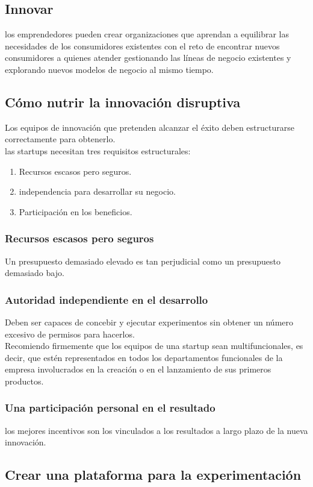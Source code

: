 \documentclass[10pt]{article}
\begin{document}
\begin{multicols}{2}
\section*{Innovar}
los emprendedores
{\color{blue}pueden crear organizaciones que aprendan a equilibrar las necesidades de los consumidores
 existentes con el reto de encontrar nuevos consumidores a quienes atender gestionando las líneas de negocio existentes y explorando nuevos modelos de negocio al mismo tiempo.}\\
\subsection*{Cómo nutrir la innovación disruptiva}
Los equipos de innovación que pretenden alcanzar el éxito deben estructurarse correctamente para obtenerlo. \\
las startups necesitan tres requisitos estructurales:
\begin{enumerate}[\bfseries 1.]
\item Recursos escasos pero seguros.
\item independencia para desarrollar su negocio.
\item Participación en los beneficios.
\end{enumerate}
\subsubsection*{Recursos escasos pero seguros}
Un presupuesto demasiado elevado es tan perjudicial como un presupuesto demasiado bajo.
\subsubsection*{Autoridad independiente en el desarrollo}
{\color{blue}Deben ser capaces de concebir y ejecutar experimentos sin obtener un número excesivo de permisos para hacerlos.}\\
Recomiendo firmemente que los equipos de una startup sean multifuncionales, es decir, que estén representados en todos los departamentos funcionales de la empresa involucrados en la creación o en el lanzamiento de sus primeros productos. 
\subsubsection*{Una participación personal en el resultado}
{\color{blue}los mejores incentivos son los vinculados a los resultados a largo plazo de la nueva innovación.}
\subsection*{Crear una plataforma para la experimentación}

\end{multicols}
\end{document}
